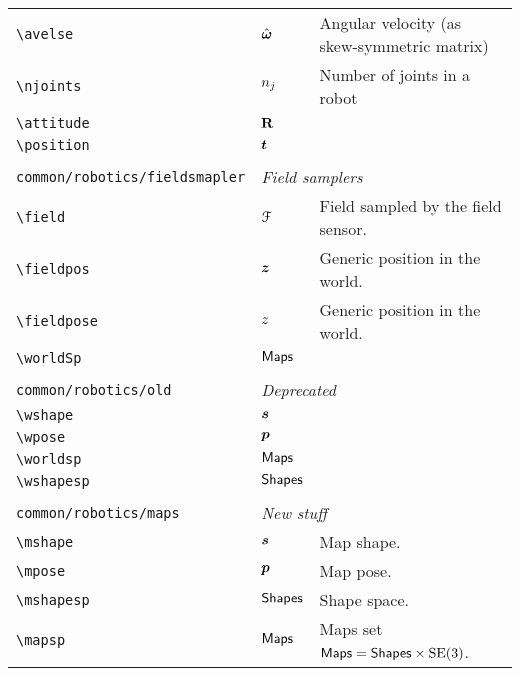 \begin{longtable}{lll}
 {\color[rgb]{0.5,0.5,0.5}\texttt{\textbackslash avelse}} & $\hat{\boldsymbol{\omega}}$ &  Angular velocity (as skew-symmetric matrix)\\ 
 {\color[rgb]{0.5,0.5,0.5}\texttt{\textbackslash njoints}} & $n_{j}$ &  Number of joints in a robot\\ 
 {\color[rgb]{0.5,0.5,0.5}\texttt{\textbackslash attitude}} & $\mathbf{R}$ & \\ 
 {\color[rgb]{0.5,0.5,0.5}\texttt{\textbackslash position}} & $\boldsymbol{t}$ & \\ 
  &  & \\ 
 {\color[rgb]{0.5,0.5,0.5}\texttt{common/robotics/fieldsmapler}} & \multicolumn{2}{l}{\emph{Field samplers}}\\ 
 \hline
{\color[rgb]{0.5,0.5,0.5}\texttt{\textbackslash field}} & $\mathcal{F}$ &  Field sampled by the field sensor.\\ 
 {\color[rgb]{0.5,0.5,0.5}\texttt{\textbackslash fieldpos}} & $\boldsymbol{z}$ &  Generic position in the world.\\ 
 {\color[rgb]{0.5,0.5,0.5}\texttt{\textbackslash fieldpose}} & $z$ &  Generic position in the world.\\ 
 {\color[rgb]{0.5,0.5,0.5}\texttt{\textbackslash worldSp}} & $\mathsf{Maps}$ & \\ 
  &  & \\ 
 {\color[rgb]{0.5,0.5,0.5}\texttt{common/robotics/old}} & \multicolumn{2}{l}{\emph{Deprecated}}\\ 
 \hline
{\color[rgb]{0.5,0.5,0.5}\texttt{\textbackslash wshape}} & $\boldsymbol{s}$ & \\ 
 {\color[rgb]{0.5,0.5,0.5}\texttt{\textbackslash wpose}} & $\boldsymbol{p}$ & \\ 
 {\color[rgb]{0.5,0.5,0.5}\texttt{\textbackslash worldsp}} & $\mathsf{Maps}$ & \\ 
 {\color[rgb]{0.5,0.5,0.5}\texttt{\textbackslash wshapesp}} & $\mathsf{Shapes}$ & \\ 
  &  & \\ 
 {\color[rgb]{0.5,0.5,0.5}\texttt{common/robotics/maps}} & \multicolumn{2}{l}{\emph{New stuff}}\\ 
 \hline
{\color[rgb]{0.5,0.5,0.5}\texttt{\textbackslash mshape}} & $\boldsymbol{s}$ &  Map shape.\\ 
 {\color[rgb]{0.5,0.5,0.5}\texttt{\textbackslash mpose}} & $\boldsymbol{p}$ &  Map pose.\\ 
 {\color[rgb]{0.5,0.5,0.5}\texttt{\textbackslash mshapesp}} & $\mathsf{Shapes}$ &  Shape space.\\ 
 {\color[rgb]{0.5,0.5,0.5}\texttt{\textbackslash mapsp}} & $\mathsf{Maps}$ &  Maps set $\mathsf{Maps} = \mathsf{Shapes} \times \mathrm{SE(3)}$.\\ 

\end{longtable}
